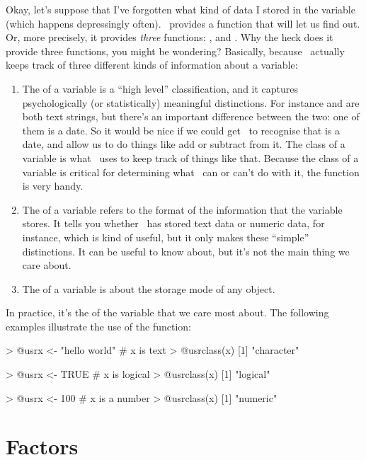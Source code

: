 Okay, let's suppose that I've forgotten what kind of data I stored in the variable  (which happens depressingly often). \R\ provides a function that will let us find out. Or, more precisely, it provides {\it three} functions: ,  and . Why the heck does it provide three functions, you might be wondering? Basically, because \R\ actually keeps track of three different kinds of information about a variable:
\begin{enumerate}
\item The  of a variable is a ``high level'' classification, and it captures psychologically (or statistically) meaningful distinctions. For instance  and  are both text strings, but there's an important difference between the two: one of them is a date. So it would be nice if we could get \R\ to recognise that  is a date, and allow us to do things like add or subtract from it. The class of a variable is what \R\ uses to keep track of things like that. Because the class of a variable is critical for determining what \R\ can or can't do with it, the  function is very handy.
\item The  of a variable refers to the format of the information that the variable stores. It tells you whether \R\ has stored text data or numeric data, for instance, which is kind of useful, but it only makes these ``simple'' distinctions. It can be useful to know about, but it's not the main thing we care about. %
\item The  of a variable is about the storage mode of any object.
\end{enumerate}

\noindent
In practice, it's the  of the variable that we care most about. The following examples illustrate the use of the  function:
\begin{rblock1}
> @usr{x <- "hello world"}     # x is text
> @usr{class(x)}
[1] "character"

> @usr{x <- TRUE}     # x is logical 
> @usr{class(x)}
[1] "logical"

> @usr{x <- 100}     # x is a number
> @usr{class(x)}
[1] "numeric"
\end{rblock1}





\section{Factors\label{sec:factors}}

